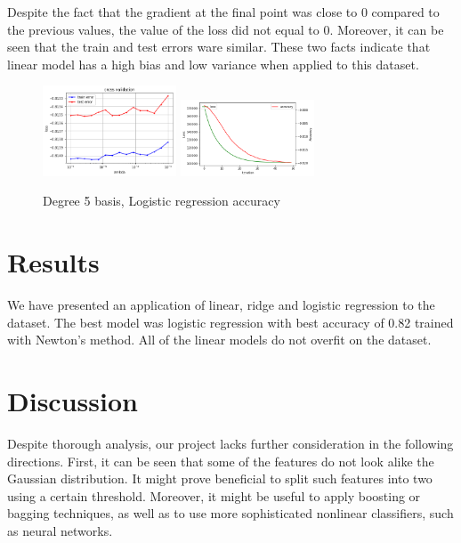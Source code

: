 \documentclass[10pt,conference,compsocconf]{IEEEtran}
\begin{document}
Despite the fact that the gradient at the final point was close to $0$ compared to the previous values, the value of the loss did not equal to 0. Moreover, it can be seen that the train and test errors ware similar. These two facts indicate that linear model has a high bias and low variance when applied to this dataset.

\begin{figure}[!htb]
	\centering \includegraphics[width=150px]{logistic_lambda_cv_netwon_nobatch}
	\centering \includegraphics[width=150px]{logistic_01}
	
	\caption{Degree 5 basis, Logistic regression accuracy}
	\label{fig:logreg}
\end{figure}

\section{Results}
We have presented an application of linear, ridge and logistic regression to the dataset. The best model was logistic regression with best accuracy of 0.82 trained with Newton's method. All of the linear models do not overfit on the dataset.
\section{Discussion}
Despite thorough analysis, our project lacks further consideration in the following directions. First, it can be seen that some of the features do not look alike the Gaussian distribution. It might prove beneficial to split such features into two using a certain threshold. Moreover, it might be useful to apply boosting or bagging techniques, as well as to use more sophisticated nonlinear classifiers, such as neural networks.
\end{document}
